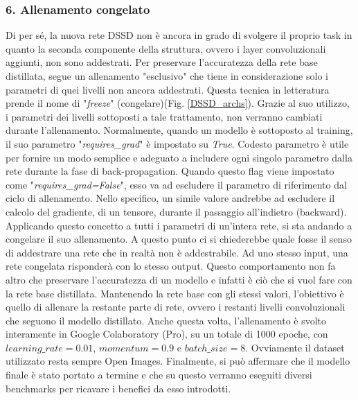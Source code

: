 \subsubsection{6. Allenamento congelato}
Di per sé, la nuova rete DSSD non è ancora in grado di svolgere il proprio 
task in quanto la seconda componente della struttura, ovvero i layer convoluzionali 
aggiunti, non sono addestrati. Per preservare l'accuratezza della rete 
base distillata, segue un allenamento "esclusivo" che tiene in considerazione 
solo i parametri di quei livelli non ancora addestrati. Questa tecnica in 
letteratura prende il nome di "\emph{freeze}" (congelare)(Fig. \ref{DSSD_archs}). Grazie al suo utilizzo, i 
parametri dei livelli sottoposti a tale trattamento, non verranno cambiati 
durante l'allenamento. Normalmente, quando un modello è sottoposto al 
training, il suo parametro "\emph{requires\_grad}" è impostato su \emph{True}. Codesto 
parametro è utile per fornire un modo semplice e adeguato a includere ogni 
singolo parametro dalla rete durante la fase di back-propagation. Quando 
questo flag viene impostato come "\emph{requires\_grad=False}", esso va ad 
escludere il parametro di riferimento dal ciclo di allenamento. Nello specifico, 
un simile valore andrebbe ad escludere il calcolo del gradiente, di un 
tensore, durante il passaggio all'indietro (backward). Applicando questo 
concetto a tutti i parametri di un'intera rete, si sta andando a congelare il 
suo allenamento. A questo punto ci si chiederebbe quale fosse il senso di 
addestrare una rete che in realtà non è addestrabile. Ad uno stesso input, 
una rete congelata risponderà con lo stesso output. Questo comportamento 
non fa altro che preservare l'accuratezza di un modello e infatti è ciò che 
si vuol fare con la rete base distillata. Mantenendo la rete base con gli 
stessi valori, l'obiettivo è quello di allenare la restante parte di rete, ovvero i 
restanti livelli convoluzionali che seguono il modello distillato. Anche questa 
volta, l'allenamento è svolto interamente in Google Colaboratory (Pro), su 
un totale di 1000 epoche, con $learning\_rate=0.01$, $momentum=0.9$ 
e $batch\_size=8$. Ovviamente il dataset utilizzato resta sempre Open 
Images. Finalmente, si può affermare che il modello finale è stato portato a 
termine e che su questo verranno eseguiti diversi benchmarks per ricavare i 
benefici da esso introdotti.  

